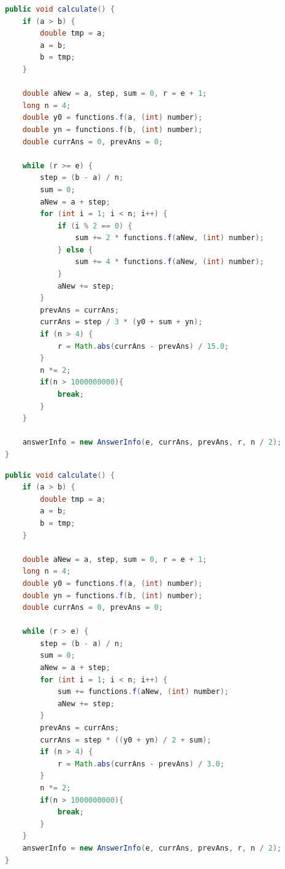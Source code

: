 \documentclass{article}
\begin{document}
\begin{lstlisting}[language=Java, caption={Метод Симпсона}]
public void calculate() {
    if (a > b) {
        double tmp = a;
        a = b;
        b = tmp;
    }

    double aNew = a, step, sum = 0, r = e + 1;
    long n = 4;
    double y0 = functions.f(a, (int) number);
    double yn = functions.f(b, (int) number);
    double currAns = 0, prevAns = 0;

    while (r >= e) {
        step = (b - a) / n;
        sum = 0;
        aNew = a + step;
        for (int i = 1; i < n; i++) {
            if (i % 2 == 0) {
                sum += 2 * functions.f(aNew, (int) number);
            } else {
                sum += 4 * functions.f(aNew, (int) number);
            }
            aNew += step;
        }
        prevAns = currAns;
        currAns = step / 3 * (y0 + sum + yn);
        if (n > 4) {
            r = Math.abs(currAns - prevAns) / 15.0;
        }
        n *= 2;
        if(n > 1000000000){
            break;
        }
    }

    answerInfo = new AnswerInfo(e, currAns, prevAns, r, n / 2);
}
\end{lstlisting}

\begin{lstlisting}[language=Java, caption={Метод Трапеций}]
public void calculate() {
    if (a > b) {
        double tmp = a;
        a = b;
        b = tmp;
    }

    double aNew = a, step, sum = 0, r = e + 1;
    long n = 4;
    double y0 = functions.f(a, (int) number);
    double yn = functions.f(b, (int) number);
    double currAns = 0, prevAns = 0;

    while (r > e) {
        step = (b - a) / n;
        sum = 0;
        aNew = a + step;
        for (int i = 1; i < n; i++) {
            sum += functions.f(aNew, (int) number);
            aNew += step;
        }
        prevAns = currAns;
        currAns = step * ((y0 + yn) / 2 + sum);
        if (n > 4) {
            r = Math.abs(currAns - prevAns) / 3.0;
        }
        n *= 2;
        if(n > 1000000000){
            break;
        }
    }
    answerInfo = new AnswerInfo(e, currAns, prevAns, r, n / 2);
}
\end{lstlisting}
 
\end{document}
